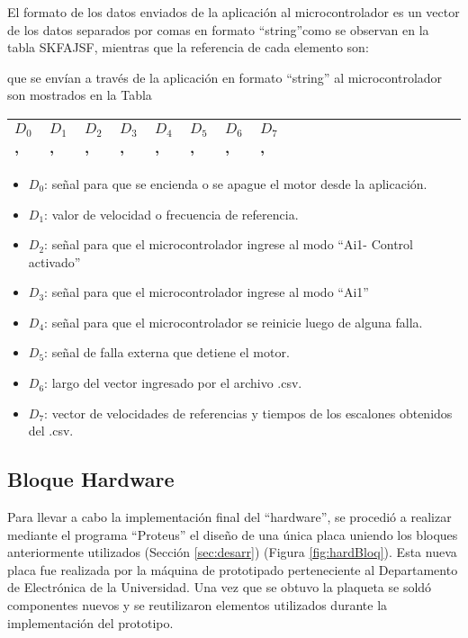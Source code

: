 El formato de los datos enviados de la aplicación al microcontrolador es un vector de los datos separados por comas en formato “string”como se observan en la tabla SKFAJSF, mientras que la referencia de cada elemento son:

que se envían a través de la aplicación en formato “string” al microcontrolador son mostrados en la Tabla
\begin{table}[h]
	\centering
	\begin{tabular}{|l|l|l|l|l|l|l|l|l|l|l|l|l|l|l|l|l|l|l|l|}
		\hline
			$D_0$ , & $D_1$ , & $D_2$ , & $D_3$ , & $D_4$ , & $D_5$ , & $D_6$ ,  & $D_7$ , \\ \hline
	\end{tabular}
\end{table}

\begin{itemize}
\item $D_0$: señal para que se encienda o se apague el motor desde la aplicación.
\item $D_1$: valor de velocidad o frecuencia de referencia.
\item $D_2$: señal para que el microcontrolador ingrese al modo “Ai1- Control activado”
\item $D_3$: señal para que el microcontrolador ingrese al modo “Ai1”
\item $D_4$: señal para que el microcontrolador se reinicie luego de alguna falla.
\item $D_5$: señal de falla externa que detiene el motor.
\item $D_6$: largo del vector ingresado por el archivo .csv.
\item $D_7$: vector de velocidades de referencias y tiempos de los escalones obtenidos del .csv.
\end{itemize}	


\subsection{Bloque Hardware} \label{sec:hard}

Para llevar a cabo la implementación final del “hardware”, se procedió a realizar mediante el programa “Proteus” el diseño de una única placa uniendo los bloques anteriormente utilizados (Sección \ref{sec:desarr}) (Figura \ref{fig:hardBloq}). Esta nueva placa fue realizada por la máquina de prototipado  perteneciente al Departamento de Electrónica de la Universidad. Una vez que se obtuvo la plaqueta se soldó componentes nuevos y se reutilizaron elementos utilizados durante la implementación del prototipo.  

